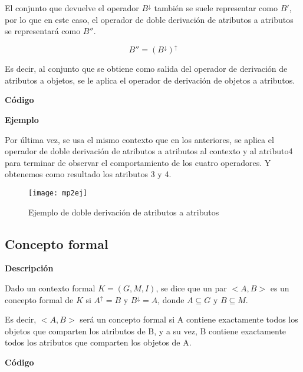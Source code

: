         El conjunto que devuelve el operador \( B^\downarrow \) tambi\'en se suele representar como \( B' \), por lo que en este caso, 
        el operador de doble derivaci\'on de atributos a atributos se representar\'a como \( B'' \).


        \[ B'' = (B^\downarrow)^\uparrow \]

        Es decir, al conjunto que se obtiene como salida del operador de derivaci\'on de atributos a objetos, se le aplica el operador 
        de derivaci\'on de objetos a atributos.

        \bigskip

        \textbf{C\'odigo}

        

        \clearpage

        \textbf{Ejemplo}

        Por \'ultima vez, se usa el mismo contexto que en los anteriores, se aplica el operador de doble derivaci\'on de 
        atributos a atributos al contexto y al atributo4 para terminar de observar el comportamiento de los cuatro operadores. Y 
        obtenemos como resultado los atributos 3 y 4.

        \begin{figure}[H]
            \centering
            \texttt{[image: mp2ej]}
            \caption{Ejemplo de doble derivaci\'on de atributos a atributos}
            \label{fig:mp2ej}
        \end{figure}
    


    \subsection{Concepto formal}

    
        \textbf{Descripci\'on}

        Dado un contexto formal \( K = (G, M, I) \), se dice que un par \( <A,B> \) es un 
        concepto formal de \(K\) si \( A^\uparrow = B \) y \( B^\downarrow = A\), donde \( A \subseteq G \) y \( B \subseteq M \).
        
        Es decir, \( <A,B> \) ser\'a un concepto formal si A contiene exactamente todos los objetos que comparten los atributos de B, y a su 
        vez, B contiene exactamente todos los atributos que comparten los objetos de A.
        

        \bigskip

        \textbf{C\'odigo}

